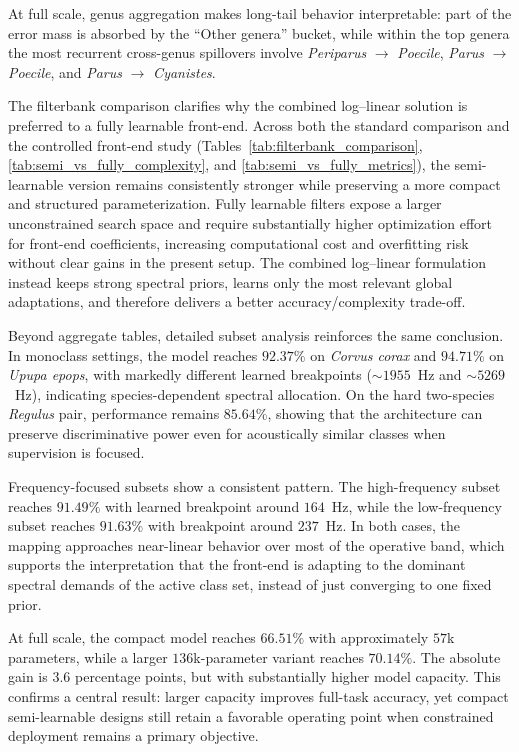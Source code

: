 \documentclass[a4paper,singleside,12pt]{report} %
\begin{document}
	At full scale, genus aggregation makes long-tail behavior interpretable: part of the error mass is absorbed by the ``Other genera'' bucket, while within the top genera the most recurrent cross-genus spillovers involve \emph{Periparus} \(\rightarrow\) \emph{Poecile}, \emph{Parus} \(\rightarrow\) \emph{Poecile}, and \emph{Parus} \(\rightarrow\) \emph{Cyanistes}.

	The filterbank comparison clarifies why the combined log--linear solution is preferred to a fully learnable front-end. Across both the standard comparison and the controlled front-end study (Tables~\ref{tab:filterbank_comparison}, \ref{tab:semi_vs_fully_complexity}, and \ref{tab:semi_vs_fully_metrics}), the semi-learnable version remains consistently stronger while preserving a more compact and structured parameterization. Fully learnable filters expose a larger unconstrained search space and require substantially higher optimization effort for front-end coefficients, increasing computational cost and overfitting risk without clear gains in the present setup. The combined log--linear formulation instead keeps strong spectral priors, learns only the most relevant global adaptations, and therefore delivers a better accuracy/complexity trade-off.

	Beyond aggregate tables, detailed subset analysis reinforces the same conclusion. In monoclass settings, the model reaches \(92.37\%\) on \emph{Corvus corax} and \(94.71\%\) on \emph{Upupa epops}, with markedly different learned breakpoints (\(\sim 1955\)~Hz and \(\sim 5269\)~Hz), indicating species-dependent spectral allocation. On the hard two-species \emph{Regulus} pair, performance remains \(85.64\%\), showing that the architecture can preserve discriminative power even for acoustically similar classes when supervision is focused.

	Frequency-focused subsets show a consistent pattern. The high-frequency subset reaches \(91.49\%\) with learned breakpoint around \(164\)~Hz, while the low-frequency subset reaches \(91.63\%\) with breakpoint around \(237\)~Hz. In both cases, the mapping approaches near-linear behavior over most of the operative band, which supports the interpretation that the front-end is adapting to the dominant spectral demands of the active class set, instead of just converging to one fixed prior.

	At full scale, the compact model reaches \(66.51\%\) with approximately \(57\)k parameters, while a larger \(136\)k-parameter variant reaches \(70.14\%\). The absolute gain is \(3.6\) percentage points, but with substantially higher model capacity. This confirms a central result: larger capacity improves full-task accuracy, yet compact semi-learnable designs still retain a favorable operating point when constrained deployment remains a primary objective.
\end{document}
